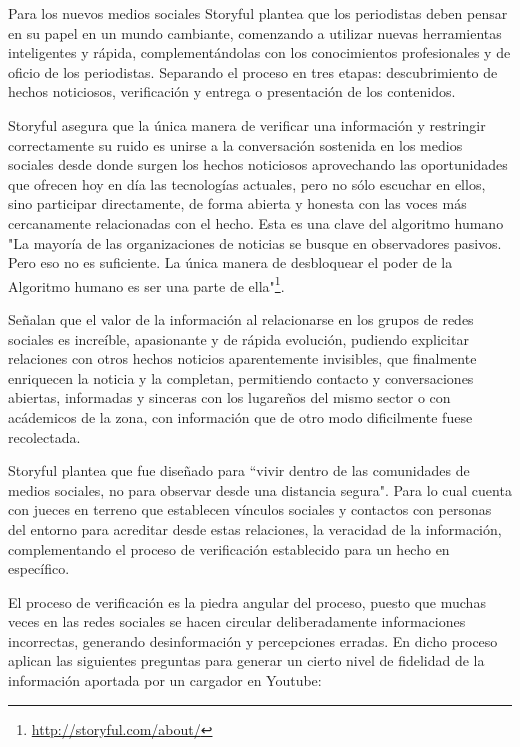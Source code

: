 Para los nuevos medios sociales Storyful plantea que los periodistas deben pensar en su papel en un mundo cambiante, comenzando a utilizar nuevas herramientas inteligentes y rápida, complementándolas con los conocimientos profesionales y de oficio de los periodistas. Separando el proceso en tres etapas: descubrimiento de hechos noticiosos, verificación y entrega o presentación de los contenidos.

Storyful asegura que la única manera de verificar una información y restringir correctamente su ruido es unirse a la conversación sostenida en los medios sociales desde donde surgen los hechos noticiosos aprovechando las oportunidades que ofrecen hoy en día las tecnologías actuales, pero no sólo escuchar en ellos, sino participar directamente, de forma abierta y honesta con las voces más cercanamente relacionadas con el hecho. Esta es una clave del algoritmo humano "La mayoría de las organizaciones de noticias se busque en observadores pasivos. Pero eso no es suficiente. La única manera de desbloquear el poder de la Algoritmo humano es ser una parte de ella"\footnote{\url{http://storyful.com/about/}}.

Señalan que el valor de la información al relacionarse en los grupos de redes sociales es increíble, apasionante y de rápida evolución, pudiendo explicitar relaciones con otros hechos noticios aparentemente invisibles, que finalmente enriquecen la noticia y la completan, permitiendo contacto y conversaciones abiertas, informadas y sinceras con los lugareños del mismo sector o con acádemicos de la zona, con información que de otro modo dificilmente fuese recolectada.

Storyful plantea que fue diseñado para ``vivir dentro de las comunidades de medios sociales, no para observar desde una distancia segura". Para lo cual cuenta con jueces en terreno que establecen vínculos sociales y contactos con personas del entorno para acreditar desde estas relaciones, la veracidad de la información, complementando el proceso de verificación establecido para un hecho en específico.

El proceso de verificación es la piedra angular del proceso, puesto que muchas veces en las redes sociales se hacen circular deliberadamente informaciones incorrectas, generando desinformación y percepciones erradas. En dicho proceso aplican las siguientes preguntas para generar un cierto nivel de fidelidad de la información aportada por un cargador en Youtube:

